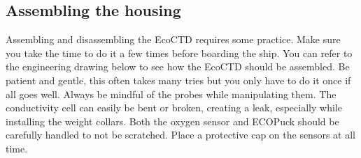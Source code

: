 \documentclass[13pt]{article}
\begin{document}
\subsection{Assembling the housing}
Assembling and disassembling the EcoCTD requires some practice. Make sure you take the time to do it a few times before boarding the ship. You can refer to the engineering drawing below to see how the EcoCTD should be assembled. Be patient and gentle, this often takes many tries but you only have to do it once if all goes well. Always be mindful of the probes while manipulating them. The conductivity cell can easily be bent or broken, creating a leak, especially while installing the weight collars. Both the oxygen sensor and ECOPuck should be carefully handled to not be scratched. Place a protective cap on the sensors at all time.
\end{document}
